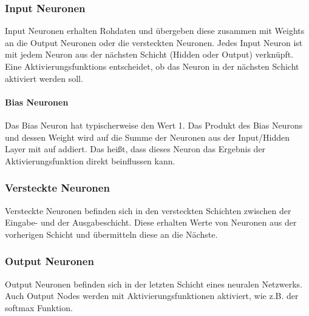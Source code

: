 \subsubsection{Input Neuronen}
Input Neuronen erhalten Rohdaten und übergeben diese zusammen mit Weights an die Output Neuronen oder die versteckten Neuronen. Jedes Input Neuron ist mit jedem Neuron aus der nächsten Schicht 
(Hidden oder Output) verknüpft. Eine Aktivierungsfunktions entscheidet, ob das Neuron in der nächsten Schicht aktiviert werden soll. 
\paragraph{Bias Neuronen}
Das Bias Neuron hat typischerweise den Wert 1. Das Produkt des Bias Neurons und dessen Weight wird auf die Summe der Neuronen aus der Input/Hidden Layer mit auf addiert. Das heißt, dass dieses Neuron
das Ergebnis der Aktivierungsfunktion direkt beinflussen kann.
\subsubsection{Versteckte Neuronen}
Versteckte Neuronen befinden sich in den versteckten Schichten zwischen der Eingabe- und der Ausgabeschicht. Diese erhalten Werte von Neuronen aus der vorherigen Schicht und übermitteln diese an die Nächste.
\subsubsection{Output Neuronen}
Output Neuronen befinden sich in der letzten Schicht eines neuralen Netzwerks. Auch Output Nodes werden mit Aktivierungsfunktionen aktiviert, wie z.B. der softmax Funktion.
